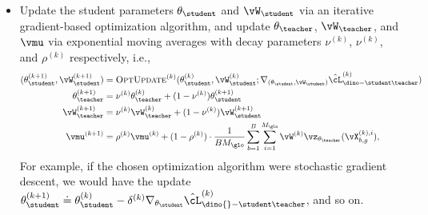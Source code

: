 \documentclass[../../book-main.tex]{subfiles}
\begin{document}
\begin{itemize}
    \begin{align}\label{eq:dino_loss_teacherstudent_empirical}
        &\hat{\cL}_{\dino{}-\student\teacher}^{(k)}(\theta_{\student}, \theta_{\teacher}, \vW_{\student}, \vW_{\teacher}, \vmu) \doteq
        \frac{1}{BM_{\glo}(M_{\glo} + M_{\loc} - 1)}\sum_{b = 1}^{B}\sum_{i = 1}^{M_{\glo}}\\
        &\Bigg[\sum_{j = 1}^{M_{\loc}}d_{\CE}(\vp_{\theta_{\teacher}, \vW_{\teacher}, \vmu}(\vX_{b, g}^{(k), i}), \vp_{\theta_{\student}, \vW_{\student}}(\vX_{b, \ell}^{(k), j})) + \sum_{\substack{j = 1 \\ j \neq i}}^{M_{\glo}}d_{\CE}(\vp_{\theta_{\teacher}, \vW_{\teacher}, \vmu}(\vX_{b, g}^{(k), i}), \vp_{\theta_{\student}, \vW_{\student}}(\vX_{b, g}^{(k), j}))\Bigg]\nonumber
    \end{align}
    as well as its gradients with respect to \(\theta_{\student}\) and \(\vW_{\student}\), which should be computed under the assumption that \(\theta_{\teacher}\), \(\vW_{\teacher}\), and \(\vmu\) are constants --- namely that they are \textit{detached from the computational graph} and not dependent on \(\theta_{\student}\) and \(\vW_{\student}\).
    \item Update the student parameters \(\theta_{\student}\) and \(\vW_{\student}\) via an iterative gradient-based optimization algorithm, and update \(\theta_{\teacher}\), \(\vW_{\teacher}\), and \(\vmu\) via exponential moving averages with decay parameters \(\nu^{(k)}\), \(\nu^{(k)}\), and \(\rho^{(k)}\) respectively, i.e., 
    \begin{align}
        (\theta_{\student}^{(k + 1)}, \vW_{\student}^{(k + 1)})
        &= \textsc{OptUpdate}^{(k)}(\theta_{\student}^{(k)}, \vW_{\student}^{(k)}; \nabla_{(\theta_{\student}, \vW_{\student})}\hat{\cL}_{\dino-\student\teacher}^{(k)}) \\
        \theta_{\teacher}^{(k + 1)}
        &= \nu^{(k)}\theta_{\teacher}^{(k)} + (1 - \nu^{(k)})\theta_{\student}^{(k + 1)} \\
        \vW_{\teacher}^{(k + 1)}
        &= \nu^{(k)}\vW_{\teacher}^{(k)} + (1 - \nu^{(k)})\vW_{\student}^{(k + 1)} \\
        \vmu^{(k + 1)}
        &= \rho^{(k)}\vmu^{(k)} + (1 - \rho^{(k)})\cdot\frac{1}{BM_{\glo}}\sum_{b = 1}^{B}\sum_{i = 1}^{M_{\glo}}\vW^{(k)}\vz_{\theta_{\teacher}}(\vX_{b, g}^{(k), i}),
    \end{align}
    For example, if the chosen optimization algorithm were stochastic gradient descent, we would have the update \(\theta_{\student}^{(k + 1)} \doteq \theta_{\student}^{(k)} - \delta^{(k)}\nabla_{\theta_{\student}}\hat{\cL}_{\dino{}-\student\teacher}^{(k)}\), and so on.
\end{itemize}
\end{document}

